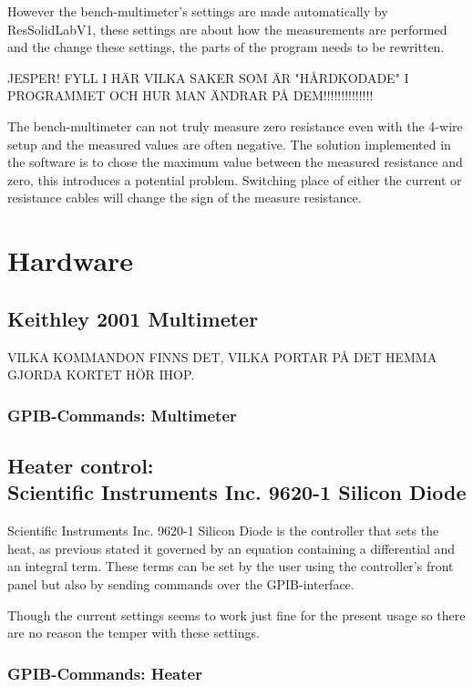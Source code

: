 \documentclass[a4paper,12pt]{article}
\begin{document}
However the bench-multimeter's settings are made automatically by ResSolidLabV1, these settings are about how the measurements are performed and the change these settings, the parts of the program needs to be rewritten.

JESPER! FYLL I HÄR VILKA SAKER SOM ÄR "HÅRDKODADE" I PROGRAMMET OCH HUR MAN ÄNDRAR PÅ DEM!!!!!!!!!!!!!!

The  bench-multimeter can not truly measure zero resistance even with the 4-wire setup and the measured values are often negative. The solution implemented in the software is to chose the maximum value between the measured resistance and zero, this introduces a potential problem. Switching place of either the current or resistance cables will change the sign of the measure resistance.


\section{Hardware}

\subsection{Keithley 2001 Multimeter}

VILKA KOMMANDON FINNS DET, VILKA PORTAR PÅ DET HEMMA GJORDA KORTET HÖR IHOP.

\subsubsection{GPIB-Commands: Multimeter}

\subsection{Heater control: \\ Scientific Instruments Inc. 9620-1 Silicon Diode}
Scientific Instruments Inc. 9620-1 Silicon Diode is the controller that sets the heat, as previous stated it governed by an equation containing a differential and an integral term. These terms can be set by the user using the controller's front panel but also by sending commands over the GPIB-interface.

Though the current settings seems to work just fine for the present usage so there are no reason the temper with these settings.

\subsubsection{GPIB-Commands: Heater}
\end{document}
